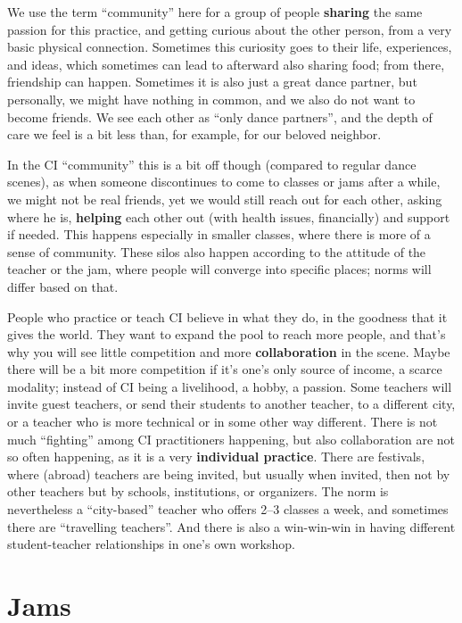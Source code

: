We use the term ``community'' here for a group of people \textbf{sharing} the same passion for this practice, and getting curious about the other person, from a very basic physical connection.
Sometimes this curiosity goes to their life, experiences, and ideas, which sometimes can lead to afterward also sharing food; from there, friendship can happen.
Sometimes it is also just a great dance partner, but personally, we might have nothing in common, and we also do not want to become friends.
We see each other as ``only dance partners'', and the depth of care we feel is a bit less than, for example, for our beloved neighbor.

In the CI ``community'' this is a bit off though (compared to regular dance scenes), as when someone discontinues to come to classes or jams after a while, we might not be real friends, yet we would still reach out for each other, asking where he is, \textbf{helping} each other out (with health issues, financially) and support if needed.
This happens especially in smaller classes, where there is more of a sense of community.
These silos also happen according to the attitude of the teacher or the jam, where people will converge into specific places; norms will differ based on that.

People who practice or teach CI believe in what they do, in the goodness that it gives the world.
They want to expand the pool to reach more people, and that's why you will see little competition and more \textbf{collaboration} in the scene.
Maybe there will be a bit more competition if it's one's only source of income, a scarce modality; instead of CI being a livelihood, a hobby, a passion.
Some teachers will invite guest teachers, or send their students to another teacher, to a different city, or a teacher who is more technical or in some other way different.
There is not much ``fighting'' among CI practitioners happening, but also collaboration are not so often happening, as it is a very \textbf{individual practice}.
There are festivals, where (abroad) teachers are being invited, but usually when invited, then not by other teachers but by schools, institutions, or organizers.
The norm is nevertheless a ``city-based'' teacher who offers 2--3 classes a week, and sometimes there are ``travelling teachers''.
And there is also a win-win-win in having different student-teacher relationships in one's own workshop.

\section{Jams}\label{sec:jams}

